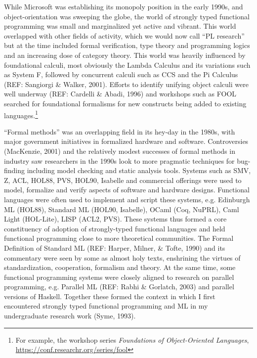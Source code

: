 \documentclass[acmsmall,review]{acmart}\settopmatter{printfolios=true,printccs=false,printacmref=false}
\begin{document}
While Microsoft was establishing its monopoly position in the early 1990s, and object-orientation was sweeping the globe, the world of strongly typed functional programming was small and marginalized yet active and vibrant.  This world overlapped with other fields of activity, which we would now call “PL research” but at the time included formal verification, type theory and programming logics and an increasing dose of category theory. This world was heavily influenced by foundational calculi, most obviously the Lambda Calculus and its variations such as System F, followed by concurrent calculi such as CCS and the Pi Calculus (REF: Sangiorgi \& Walker, 2001).  Efforts to identify unifying object calculi were well underway (REF: Cardelli \& Abadi, 1996) and workshops such as FOOL searched for foundational formalisms for new constructs being added to existing languages.\footnote{For example, the workshop series \textit{Foundations of Object-Oriented Languages}, \url{https://conf.researchr.org/series/fool}} 

“Formal methods” was an overlapping field in its hey-day in the 1980s, with major government initiatives in formalized hardware and software.  Controversies (MacKenzie, 2001) and the relatively modest successes of formal methods in industry saw researchers in the 1990s look to more pragmatic techniques for bug-finding including model checking and static analysis tools. Systems such as SMV, Z, ACL, HOL88, PVS, HOL90, Isabelle and commercial offerings were used to model, formalize and verify aspects of software and hardware designs.   Functional languages were often used to implement and script these systems, e.g. Edinburgh ML (HOL88), Standard ML (HOL90, Isabelle), OCaml (Coq, NuPRL), Caml Light (HOL-Lite), LISP (ACL2, PVS).  These systems thus formed a core constituency of adoption of strongly-typed functional languages and held functional programming close to more theoretical communities.  The Formal Definition of Standard ML (REF: Harper, Milner, \& Tofte, 1990) and its commentary were seen by some as almost holy texts, enshrining the virtues of standardization, cooperation, formalism and theory. At the same time, some functional programming systems were closely aligned to research on parallel programming, e.g. Parallel ML (REF: Rabhi \& Gorlatch, 2003) and parallel versions of Haskell.  Together these formed the context in which I first encountered strongly typed functional programming and ML in my undergraduate research work (Syme, 1993).
\end{document}

